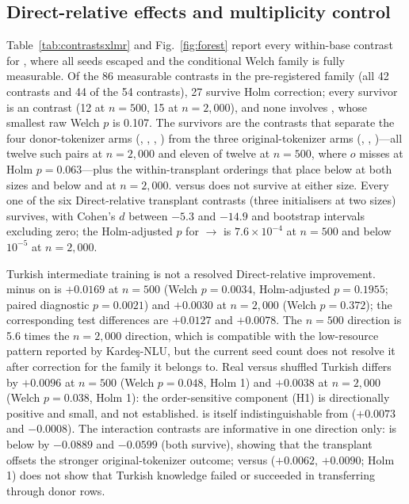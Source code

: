 \subsection{Direct-relative effects and multiplicity control}
\label{sec:res:effects}
Table~\ref{tab:contrastsxlmr} and Fig.~\ref{fig:forest} report every within-base contrast for \xlmr{}, where all seeds escaped and the conditional Welch family is fully measurable. Of the 86 measurable contrasts in the pre-registered family (all 42 \xlmr{} contrasts and 44 of the 54 \xlmxv{} contrasts), 27 survive Holm correction; every survivor is an \xlmr{} contrast (12 at $n=500$, 15 at $n=2{,}000$), and none involves \xlmxv, whose smallest raw Welch $p$ is 0.107. The survivors are the contrasts that separate the four donor-tokenizer arms (\OMP, \Mean, \Random, \OMPTR) from the three original-tokenizer arms (\Direct, \TR, \ShufTR)---all twelve such pairs at $n=2{,}000$ and eleven of twelve at $n=500$, where \Direct$	o$\OMPTR{} misses at Holm $p=0.063$---plus the within-transplant orderings that place \Random{} below \Mean{} at both sizes and below \OMP{} and \OMPTR{} at $n=2{,}000$. \OMP{} versus \Mean{} does not survive at either size. Every one of the six Direct-relative transplant contrasts (three initialisers at two sizes) survives, with Cohen's $d$ between $-5.3$ and $-14.9$ and bootstrap intervals excluding zero; the Holm-adjusted $p$ for \Direct$\to$\OMP{} is $7.6\times10^{-4}$ at $n=500$ and below $10^{-5}$ at $n=2{,}000$.

Turkish intermediate training is not a resolved Direct-relative improvement. \TR{} minus \Direct{} on \xlmr{} is $+0.0169$ at $n=500$ (Welch $p=0.0034$, Holm-adjusted $p=0.1955$; paired diagnostic $p=0.0021$) and $+0.0030$ at $n=2{,}000$ (Welch $p=0.372$); the corresponding test differences are $+0.0127$ and $+0.0078$. The $n=500$ direction is 5.6 times the $n=2{,}000$ direction, which is compatible with the low-resource pattern reported by Kardeş-NLU, but the current seed count does not resolve it after correction for the family it belongs to. Real versus shuffled Turkish differs by $+0.0096$ at $n=500$ (Welch $p=0.048$, Holm 1) and $+0.0038$ at $n=2{,}000$ (Welch $p=0.038$, Holm 1): the order-sensitive component (H1) is directionally positive and small, and not established. \ShufTR{} is itself indistinguishable from \Direct{} ($+0.0073$ and $-0.0008$). The interaction contrasts are informative in one direction only: \OMPTR{} is below \TR{} by $-0.0889$ and $-0.0599$ (both survive), showing that the transplant offsets the stronger original-tokenizer outcome; \OMPTR{} versus \OMP{} ($+0.0062$, $+0.0090$; Holm 1) does not show that Turkish knowledge failed or succeeded in transferring through donor rows.

